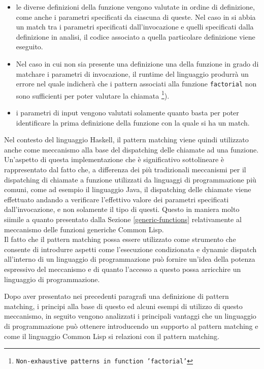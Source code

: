 \begin{itemize}

\item le diverse definizioni della funzione vengono valutate in ordine di
definizione, come anche i parametri specificati da ciascuna di queste. Nel caso
in si abbia un match tra i parametri specificati dall'invocazione e quelli
specificati dalla definizione in analisi, il codice associato a quella
particolare definizione viene eseguito.

\item Nel caso in cui non sia presente una definizione una della funzione in
grado di matchare i parametri di invocazione, il runtime del linguaggio produrrà
un errore nel quale indicherà che i pattern associati alla funzione
\texttt{factorial} non sono sufficienti per poter valutare la chiamata
\footnote{\texttt{Non-exhaustive patterns in function 'factorial'}}).

\item i parametri di input vengono valutati solamente quanto basta per poter
identificare la prima definizione della funzione con la quale si ha un match.

\end{itemize}

Nel contesto del linguaggio Haskell, il pattern matching viene quindi utilizzato
anche come meccanismo alla base del dispatching delle chiamate ad una funzione.
Un’aspetto di questa implementazione che è significativo sottolineare è
rappresentato dal fatto che, a differenza dei più tradizionali meccanismi per il
dispatching di chiamate a funzione utilizzati da linguaggi di programmazione più
comuni, come ad esempio il linguaggio Java, il dispatching delle chiamate viene
effettuato andando a verificare l’effettivo valore dei parametri specificati
dall’invocazione, e non solamente il tipo di questi. Questo in maniera molto
siimile a quanto presentato dalla Sezione \ref{generic-functions} relativamente
al meccanismo delle funzioni generiche Common Lisp.\\

Il fatto che il pattern matching possa essere utilizzato come strumento che
consente di introdurre aspetti come l’esecuzione condizionata e dynamic dispatch
all’interno di un linguaggio di programmazione può fornire un’idea della potenza
espressivo del meccanismo e di quanto l'accesso a questo possa arricchire un
linguaggio di programmazione.

Dopo aver presentato nei precedenti paragrafi una definizione di pattern
matching, i principi alla base di questo ed alcuni esempi di utilizzo di questo
meccanismo, in seguito vengono analizzati i principali vantaggi che un
linguaggio di programmazione può ottenere introducendo un supporto al pattern
matching e come il linguaggio Common Lisp si relazioni con il pattern
matching.\\

